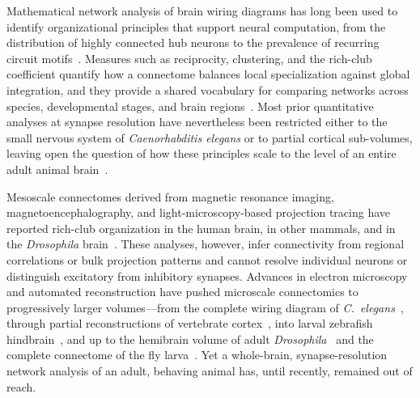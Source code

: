 \documentclass[11pt]{article}
\begin{document}
Mathematical network analysis of brain wiring diagrams has long been used to
identify organizational principles that support neural computation, from
the distribution of highly connected hub neurons to the prevalence of
recurring circuit motifs~\cite{sporns2004organization,bullmore2009complex,milo2002network}.
Measures such as reciprocity, clustering, and the rich-club coefficient
quantify how a connectome balances local specialization against global
integration, and they provide a shared vocabulary for comparing networks
across species, developmental stages, and brain
regions~\cite{watts1998collective,colizza2006detecting,vandenheuvel2011rich}.
Most prior quantitative analyses at synapse resolution have nevertheless
been restricted either to the small nervous system of
\textit{Caenorhabditis elegans} or to partial cortical sub-volumes, leaving
open the question of how these principles scale to the level of an entire
adult animal
brain~\cite{varshney2011structural,cook2019whole,song2005highly,motta2019dense}.

Mesoscale connectomes derived from magnetic resonance imaging,
magnetoencephalography, and light-microscopy-based projection tracing have
reported rich-club organization in the human brain, in other mammals, and
in the \textit{Drosophila}
brain~\cite{vandenheuvel2011rich,fornito2015connectomics,shih2015connectomics}.
These analyses, however, infer connectivity from regional correlations or
bulk projection patterns and cannot resolve individual neurons or
distinguish excitatory from inhibitory synapses. Advances in electron
microscopy and automated reconstruction have pushed microscale
connectomics to progressively larger volumes---from the complete wiring
diagram of \textit{C.\ elegans}~\cite{white1986structure,cook2019whole,varshney2011structural},
through partial reconstructions of vertebrate
cortex~\cite{song2005highly,motta2019dense,loomba2022connectomic}, into
larval zebrafish hindbrain~\cite{svara2022automated}, and up to the
hemibrain volume of adult \textit{Drosophila}~\cite{scheffer2020connectome}
and the complete connectome of the fly larva~\cite{winding2023connectome}.
Yet a whole-brain, synapse-resolution network analysis of an adult,
behaving animal has, until recently, remained out of reach.
\end{document}
